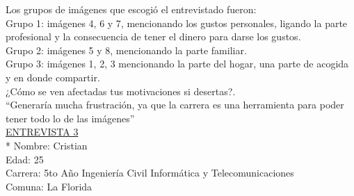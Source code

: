 Los grupos de imágenes que escogió el entrevistado fueron:\\

Grupo 1: imágenes 4, 6 y 7, mencionando los gustos personales, ligando la parte profesional y la consecuencia de tener el dinero para darse los gustos.\\

Grupo 2: imágenes 5 y 8, mencionando la parte familiar.\\

Grupo 3: imágenes 1, 2, 3  mencionando la parte del hogar, una parte de acogida y en donde compartir.\\

¿Cómo se ven afectadas tus motivaciones si desertas?.\\

``Generaría mucha frustración, ya que la carrera es una herramienta para poder tener todo lo de las imágenes''\\


\underline {ENTREVISTA 3} \\* 
Nombre: Cristian\\
Edad: 25\\
Carrera: 5to Año Ingeniería Civil Informática y Telecomunicaciones\\
Comuna: La Florida\\

